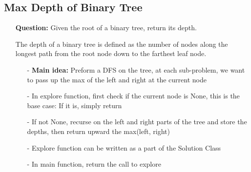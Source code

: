 \documentclass[12pt]{article}
\begin{document}
\subsection{Max Depth of Binary Tree}
\begin{enumerate}
  \item[] \textbf{Question:} Given the root of a binary tree, return its depth.

The depth of a binary tree is defined as the number of nodes along the longest path from the root node down to the farthest leaf node.

    \begin{enumerate}
      \item[-] \textbf{Main idea:} Preform a DFS on the tree, at each sub-problem, we want to pass up the max of the left and right at the current node
      \item[-] In explore function, first check if the current node is None, this is the base case: If it is, simply return 
      \item[-] If not None, recurse on the left and right parts of the tree and store the depths, then return upward the max(left, right)
      \item[-] Explore function can be written as a part of the Solution Class
      \item[-] In main function, return the call to explore


    \end{enumerate}
\end{enumerate}
\end{document}
